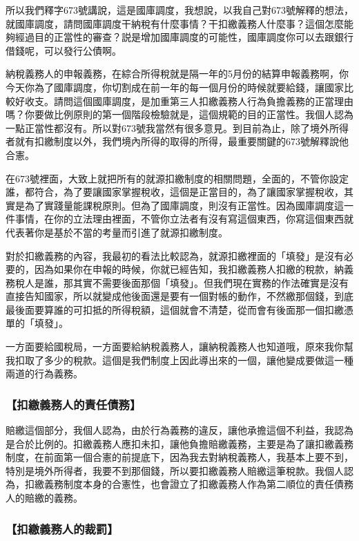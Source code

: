 \documentclass[oneside,sub3section]{ctexbook}
\begin{document}
所以我們釋字673號講說，這是國庫調度，我想說，以我自己對673號解釋的想法，就國庫調度，請問國庫調度干納稅有什麼事情？干扣繳義務人什麼事？這個怎麼能夠經過目的正當性的審查？説是增加國庫調度的可能性，國庫調度你可以去跟銀行借錢呢，可以發行公債啊。

納稅義務人的申報義務，在綜合所得稅就是隔一年的5月份的結算申報義務啊，你今天你為了國庫調度，你切割成在前一年的每一個月份的時候就要給錢，讓國家比較好收支。請問這個國庫調度，是加重第三人扣繳義務人行為負擔義務的正當理由嗎？你要做比例原則的第一個階段檢驗就是，這個規範的目的正當性。我個人認為一點正當性都沒有。所以對673號我當然有很多意見。到目前為止，除了境外所得者就有扣繳制度以外，我們境內所得的取得的所得，最重要關鍵的673號解釋說他合憲。

在673號裡面，大致上就把所有的就源扣繳制度的相關問題，全面的，不管你設定誰，都符合，為了要讓國家掌握稅收，這個是正當目的，為了讓國家掌握稅收，其實是為了實踐量能課稅原則。但為了國庫調度，則沒有正當性。因為國庫調度這一件事情，在你的立法理由裡面，不管你立法者有沒有寫這個東西，你寫這個東西就代表著你是基於不當的考量而引進了就源扣繳制度。

對於扣繳義務的內容，我最初的看法比較認為，就源扣繳裡面的「填發」是沒有必要的，因為如果你在申報的時候，你就已經告知，我扣繳義務人扣繳的稅款，納義務稅人是誰，那其實不需要後面那個「填發」。但我們現在實務的作法確實是沒有直接告知國家，所以就變成他後面還是要有一個對帳的動作，不然繳那個錢，到底最後面要算誰的可扣抵的所得稅額，這個就會不清楚，從而會有後面那一個扣繳憑單的「填發」。

一方面要給國稅局，一方面要給納稅義務人，讓納稅義務人也知道哦，原來我你幫我扣取了多少的稅款。這個是我們制度上因此導出來的一個，讓他變成要做這一種兩道的行為義務。

\hypertarget{ux6263ux7e73ux7fa9ux52d9ux4ebaux7684ux8cacux4efbux50b5ux52d9-1}{%
\subsubsection{【扣繳義務人的責任債務】}\label{ux6263ux7e73ux7fa9ux52d9ux4ebaux7684ux8cacux4efbux50b5ux52d9-1}}

賠繳這個部分，我個人認為，由於行為義務的違反，讓他承擔這個不利益，我認為是合於比例的。扣繳義務人應扣未扣，讓他負擔賠繳義務，主要是為了讓扣繳義務制度，在前面第一個合憲的前提底下，因為我去對納稅義務人，我基本上要不到，特別是境外所得者，我要不到那個錢，所以要扣繳義務人賠繳這筆稅款。我個人認為，扣繳義務制度本身的合憲性，也會證立了扣繳義務人作為第二順位的責任債務人的賠繳的義務。

\hypertarget{ux6263ux7e73ux7fa9ux52d9ux4ebaux7684ux88c1ux7f70}{%
\subsubsection{【扣繳義務人的裁罰】}\label{ux6263ux7e73ux7fa9ux52d9ux4ebaux7684ux88c1ux7f70}}
\end{document}
